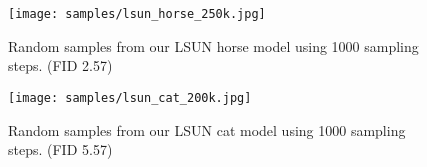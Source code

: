\documentclass{article}
\begin{document}
\begin{figure}[h]
    \centerline{\texttt{[image: samples/lsun\_horse\_250k.jpg]}}
    \caption{Random samples from our LSUN horse model using 1000 sampling steps. (FID 2.57)}
    \vskip -1in
\end{figure}

\begin{figure}[h]
    \centerline{\texttt{[image: samples/lsun\_cat\_200k.jpg]}}
    \caption{Random samples from our LSUN cat model using 1000 sampling steps. (FID 5.57)}
    \vskip -1in
\end{figure}
\end{document}

